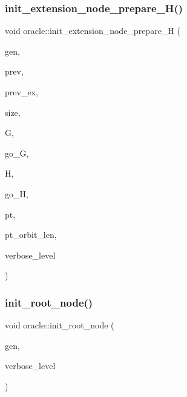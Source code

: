 \subsubsection{\texorpdfstring{init\+\_\+extension\+\_\+node\+\_\+prepare\+\_\+\+H()}{init\_extension\_node\_prepare\_H()}}
{\footnotesize\ttfamily void oracle\+::init\+\_\+extension\+\_\+node\+\_\+prepare\+\_\+H (\begin{DoxyParamCaption}\item[{\mbox{\hyperlink{classgenerator}{generator}} $\ast$}]{gen,  }\item[{\mbox{\hyperlink{galois_8h_a09fddde158a3a20bd2dcadb609de11dc}{I\+NT}}}]{prev,  }\item[{\mbox{\hyperlink{galois_8h_a09fddde158a3a20bd2dcadb609de11dc}{I\+NT}}}]{prev\+\_\+ex,  }\item[{\mbox{\hyperlink{galois_8h_a09fddde158a3a20bd2dcadb609de11dc}{I\+NT}}}]{size,  }\item[{\mbox{\hyperlink{classgroup}{group}} \&}]{G,  }\item[{\mbox{\hyperlink{classlonginteger__object}{longinteger\+\_\+object}} \&}]{go\+\_\+G,  }\item[{\mbox{\hyperlink{classgroup}{group}} \&}]{H,  }\item[{\mbox{\hyperlink{classlonginteger__object}{longinteger\+\_\+object}} \&}]{go\+\_\+H,  }\item[{\mbox{\hyperlink{galois_8h_a09fddde158a3a20bd2dcadb609de11dc}{I\+NT}}}]{pt,  }\item[{\mbox{\hyperlink{galois_8h_a09fddde158a3a20bd2dcadb609de11dc}{I\+NT}}}]{pt\+\_\+orbit\+\_\+len,  }\item[{\mbox{\hyperlink{galois_8h_a09fddde158a3a20bd2dcadb609de11dc}{I\+NT}}}]{verbose\+\_\+level }\end{DoxyParamCaption})}

\mbox{\label{classoracle_a39267b7776b0cc2d93cda40fce9813a2}} 
\subsubsection{\texorpdfstring{init\+\_\+root\+\_\+node()}{init\_root\_node()}}
{\footnotesize\ttfamily void oracle\+::init\+\_\+root\+\_\+node (\begin{DoxyParamCaption}\item[{\mbox{\hyperlink{classgenerator}{generator}} $\ast$}]{gen,  }\item[{\mbox{\hyperlink{galois_8h_a09fddde158a3a20bd2dcadb609de11dc}{I\+NT}}}]{verbose\+\_\+level }\end{DoxyParamCaption})}

